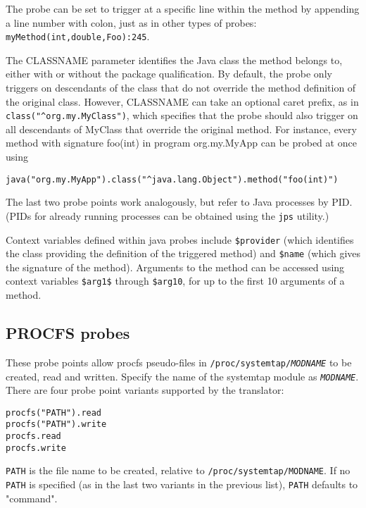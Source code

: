 \documentclass[twoside,english]{article}
\newenvironment{vindent}
{\begin{list}{}{\setlength{\listparindent}{6pt}}
\item[]}
{\end{list}}
\begin{document}
The probe can be set to trigger at a specific line within the method
by appending a line number with colon, just as in other types of
probes: \texttt{myMethod(int,double,Foo):245}.

The CLASSNAME parameter identifies the Java class the method belongs
to, either with or without the package qualification. By default, the
probe only triggers on descendants of the class that do not override
the method definition of the original class. However, CLASSNAME can
take an optional caret prefix, as in
\verb+class("^org.my.MyClass")+, which specifies that the probe
should also trigger on all descendants of MyClass that override the
original method. For instance, every method with signature foo(int) in
program org.my.MyApp can be probed at once using
\begin{vindent}
\begin{verbatim}
java("org.my.MyApp").class("^java.lang.Object").method("foo(int)")
\end{verbatim}
\end{vindent}

The last two probe points work analogously, but refer to Java
processes by PID. (PIDs for already running processes can be obtained
using the \texttt{jps} utility.)

Context variables defined within java probes include \verb+$provider+
(which identifies the class providing the definition of the triggered
method) and \verb+$name+ (which gives the signature of the method).
Arguments to the method can be accessed using context variables
\verb+$arg1$+ through \verb+$arg10+, for up to the first 10 arguments
of a method.

\subsection{PROCFS probes}
These probe points allow procfs pseudo-files in
\texttt{/proc/systemtap/\textit{MODNAME}} to be created, read and
written.  Specify the name of the systemtap module as
\texttt{\textit{MODNAME}}.  There are four probe point variants
supported by the translator:
\begin{vindent}
\begin{verbatim}
procfs("PATH").read
procfs("PATH").write
procfs.read
procfs.write
\end{verbatim}
\end{vindent}

\texttt{PATH} is the file name to be created, relative to
\texttt{/proc/systemtap/MODNAME}.  If no \texttt{PATH} is specified
(as in the last two variants in the previous list), \texttt{PATH}
defaults to "command".
\end{document}
